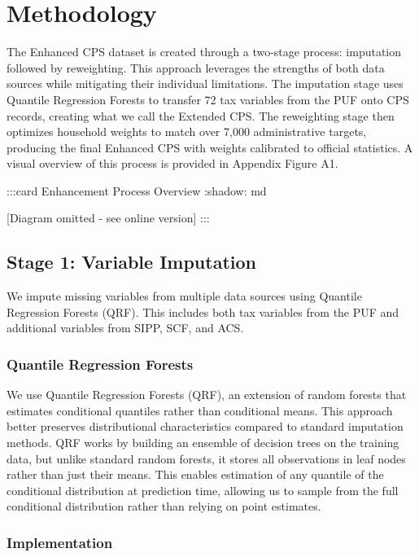 \section{Methodology}

The Enhanced CPS dataset is created through a two-stage process: imputation followed by reweighting. This approach leverages the strengths of both data sources while mitigating their individual limitations. The imputation stage uses Quantile Regression Forests to transfer 72 tax variables from the PUF onto CPS records, creating what we call the Extended CPS. The reweighting stage then optimizes household weights to match over 7,000 administrative targets, producing the final Enhanced CPS with weights calibrated to official statistics. A visual overview of this process is provided in Appendix Figure A1.

:::{card} Enhancement Process Overview
:shadow: md

[Diagram omitted - see online version]
:::

\subsection{Stage 1: Variable Imputation}

We impute missing variables from multiple data sources using Quantile Regression Forests (QRF). This includes both tax variables from the PUF and additional variables from SIPP, SCF, and ACS.

\subsubsection{Quantile Regression Forests}

We use Quantile Regression Forests (QRF), an extension of random forests that estimates conditional quantiles rather than conditional means. This approach better preserves distributional characteristics compared to standard imputation methods. QRF works by building an ensemble of decision trees on the training data, but unlike standard random forests, it stores all observations in leaf nodes rather than just their means. This enables estimation of any quantile of the conditional distribution at prediction time, allowing us to sample from the full conditional distribution rather than relying on point estimates.

\subsubsection{Implementation}

